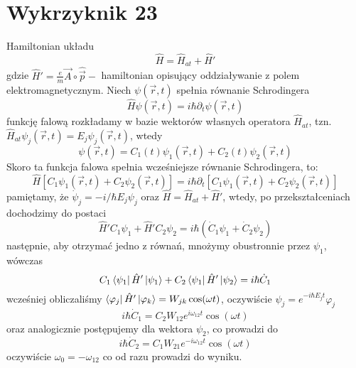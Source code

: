 \documentclass[a4paper,12pt]{article}
\begin{document}
\section{Wykrzyknik 23}
	Hamiltonian układu
		$$
		\hat{H} = \hat{H}_{at} + \hat{H}'
		$$
	gdzie $\hat{H}'=\frac{e}{m}\vec{A}\circ\hat{\vec{p}}-$ hamiltonian opisujący oddziaływanie z polem elektromagnetycznym. Niech $\psi(\vec{r},t)$ spełnia równanie Schrodingera
		$$
		\hat{H}\psi(\vec{r},t)=i\hbar\partial_t \psi(\vec{r},t)
		$$
	funkcję falową rozkładamy w bazie wektorów własnych operatora $\hat{H}_{at}$, tzn. $\hat{H}_{at}\psi_j(\vec{r},t) = E_j\psi_j(\vec{r},t)$, wtedy
		$$
		\psi(\vec{r},t) = C_1(t)\psi_1(\vec{r},t) + C_2(t)\psi_2(\vec{r},t)
		$$
	Skoro ta funkcja falowa spełnia wcześniejsze równanie Schrodingera, to:
		$$
		\hat{H}\left[C_1\psi_1(\vec{r},t) + C_2\psi_2(\vec{r},t)\right] = i\hbar\partial_t\left[C_1\psi_1(\vec{r},t) + C_2\psi_2(\vec{r},t)\right]
		$$
	pamiętamy, że $\dot{\psi}_j = -i/\hbar E_j \psi_j$ oraz $\hat{H} = \hat{H}_{at} + \hat{H}'$, wtedy, po przekształceniach dochodzimy do postaci
		$$
		\hat{H}'C_1\psi_1 + \hat{H}'C_2\psi_2 = i\hbar\left(\dot{C}_1\psi_1+\dot{C}_2\psi_2\right)
		$$
	następnie, aby otrzymać jedno z równań, mnożymy obustronnie przez $\psi_1$, wówczas
		$$
		C_1\bra{\psi_1}\hat{H}'\ket{\psi_1}+C_2\bra{\psi_1}\hat{H}'\ket{\psi_2} = i\hbar\dot{C}_1
		$$
	wcześniej obliczaliśmy $\bra{\varphi_j}\hat{H}'\ket{\varphi_k} = W_{jk}\cos(\omega t)$, oczywiście $\psi_j = e^{-i\hbar E_j t}\varphi_j$
		$$
		i\hbar\dot{C}_1 = C_2 W_{12}e^{i\omega_{12}t}\cos(\omega t)
		$$
	oraz analogicznie postępujemy dla wektora $\psi_2$, co prowadzi do
		$$
		i\hbar\dot{C}_2 = C_1 W_{21}e^{-i\omega_{12}t}\cos(\omega t)
		$$
	oczywiście $\omega_0 = -\omega_{12}$ co od razu prowadzi do wyniku.
\end{document}
